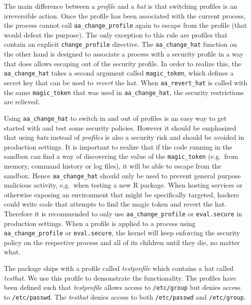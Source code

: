 \documentclass[article]{jss}
\newcommand{\R}{\textsf{R}\xspace}
\newcommand{\RAppArmor}{\pkg{RAppArmor}\xspace}
\begin{document}
The main difference between a \emph{profile} and a \emph{hat} is that switching
profiles is an irreversible action. Once the profile has been associated with
the current process, the process cannot call \texttt{aa\_change\_profile} again
to escape from the profile (that would defeat the purpose). The only exception
to this rule are profiles that contain an explicit \texttt{change\_profile}
directive. The \texttt{aa\_change\_hat} function on the other hand is designed to
associate a process with a security profile in a way that does allows escaping
out of the security profile. In order to realize this, the
\texttt{aa\_change\_hat} takes a second argument called \texttt{magic\_token},
which defines a secret key that can be used to \emph{revert} the hat. When
\texttt{aa\_revert\_hat} is called with the same \texttt{magic\_token} that
was used in \texttt{aa\_change\_hat}, the security restrictions are
relieved.

Using \texttt{aa\_change\_hat} to switch in and out of profiles is an easy way
to get started with \RAppArmor and test some security policies. However it
should be emphasized that using \emph{hats} instead of \emph{profiles} is also a
security risk and should be avoided in production settings. It is important to
realize that if the code running in the sandbox can find a way of discovering
the value of the \texttt{magic\_token} (e.g.\ from memory, command history or log
files), it will be able to escape from the sandbox. Hence
\texttt{aa\_change\_hat} should only be used to prevent general purpose
malicious activity, e.g.\ when testing a new \R package. When hosting services
or otherwise exposing an environment that might be specifically targeted,
hackers could write code that attempts to find the magic token and revert the
hat. Therefore it is recommended to only use \texttt{aa\_change\_profile} or
\texttt{eval.secure} in production settings. When a profile is applied to a
process using \texttt{aa\_change\_profile} or \texttt{eval.secure}, the kernel
will keep enforcing the security policy on the respective process and all of its
children until they die, no matter what.

The \RAppArmor package ships with a profile called \emph{testprofile} which
contains a hat called \emph{testhat}. We use this profile to demonstrate the
functionality. The profiles have been defined such that \emph{testprofile}
allows access to \texttt{/etc/group} but denies access to \texttt{/etc/passwd}.
The \emph{testhat} denies access to both \texttt{/etc/passwd} and
\texttt{/etc/group}.
\end{document}
